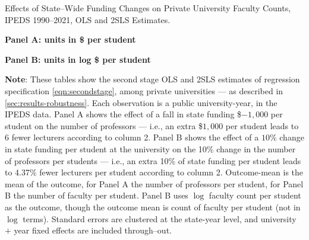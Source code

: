 \begin{table}[H]
    \singlespacing
    \centering
    \caption{Effects of State--Wide Funding Changes on Private University Faculty Counts, IPEDS 1990--2021, OLS and 2SLS Estimates.}

    \textbf{Panel A: units in \$ per student}

    \makebox[\textwidth][c]{}
    
    \textbf{Panel B: units in log \$ per student}
    
    \makebox[\textwidth][c]{}

    \label{tab:facultycount-shock-private-robustness}
    \justify
    \footnotesize
    \textbf{Note}:
    These tables show the second stage OLS and 2SLS estimates of regression specification \eqref{eqn:secondstage}, among private universities --- as described in \autoref{sec:results-robustness}.
    Each observation is a public university-year, in the IPEDS data.
    Panel A shows the effect of a fall in state funding \$$-1,000$ per student on the number of professors --- i.e.,
    an extra \$$1,000$ per student leads to 6 fewer lecturers according to column 2.
    Panel B shows the effect of a $10$\% change in state funding per student at the university on the 10\% change in the number of professors per students --- i.e.,
    an extra 10\% of state funding per student leads to 4.37\% fewer lecturers per student according to column 2.
    Outcome-mean is the mean of the outcome, for Panel A the number of professors per student, for Panel B the number of faculty per student.
    Panel B uses $\log$ faculty count per student as the outcome, though the outcome mean is count of faculty per student (not in $\log$ terms).
    Standard errors are clustered at the state-year level, and university $+$ year fixed effects are included through--out.
\end{table}

